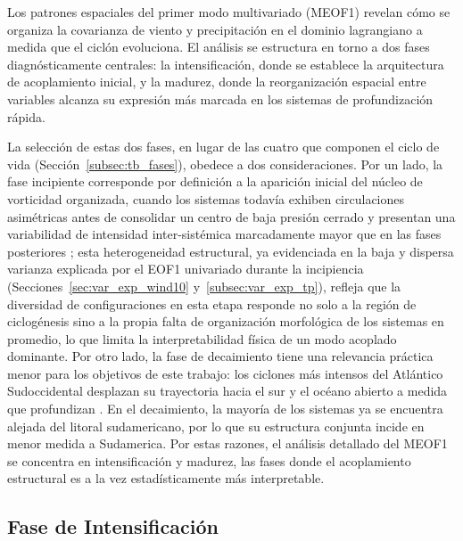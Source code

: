 Los patrones espaciales del primer modo multivariado (MEOF1) revelan cómo se organiza la covarianza de viento y precipitación en el dominio lagrangiano a medida que el ciclón evoluciona.
El análisis se estructura en torno a dos fases diagnósticamente centrales: la intensificación, donde se establece la arquitectura de acoplamiento inicial, y la madurez, donde la reorganización espacial entre variables alcanza su expresión más marcada en los sistemas de profundización rápida.

La selección de estas dos fases, en lugar de las cuatro que componen el ciclo de vida (Sección~\ref{subsec:tb_fases}), obedece a dos consideraciones. 
Por un lado, la fase incipiente corresponde por definición a la aparición inicial del núcleo de vorticidad organizada, cuando los sistemas todavía exhiben circulaciones asimétricas antes de consolidar un centro de baja presión cerrado \citep{bartolomei2024extremos} y presentan una variabilidad de intensidad inter-sistémica marcadamente mayor que en las fases posteriores \citep{reboita2010south}; esta heterogeneidad estructural, ya evidenciada en la baja y dispersa varianza explicada por el EOF1 univariado durante la incipiencia (Secciones~\ref{sec:var_exp_wind10} y~\ref{subsec:var_exp_tp}), refleja que la diversidad de configuraciones en esta etapa responde no solo a la región de ciclogénesis sino a la propia falta de organización morfológica de los sistemas en promedio, lo que limita la interpretabilidad física de un modo acoplado dominante. Por otro lado, la fase de decaimiento tiene una relevancia práctica menor para los objetivos de este trabajo: los ciclones más intensos del Atlántico Sudoccidental desplazan su trayectoria hacia el sur y el océano abierto a medida que profundizan \citep{andrade2024composite}. En el decaimiento, la mayoría de los sistemas ya se encuentra alejada del litoral sudamericano, por lo que su estructura conjunta incide en menor medida a Sudamerica. 
Por estas razones, el análisis detallado del MEOF1 se concentra en intensificación y madurez, las fases donde el acoplamiento estructural es a la vez estadísticamente más interpretable.

\subsection{Fase de Intensificación}
\label{subsec:meof_intensificacion}

